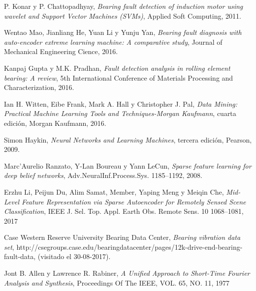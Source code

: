 \documentclass[12pt]{article}%
\begin{document}
\begin{thebibliography}{9}
P. Konar y P. Chattopadhyay, \textit{Bearing fault detection of induction motor using wavelet and Support Vector Machines (SVMs)}, Applied Soft Computing, 2011.

Wentao Mao, Jianliang He, Yuan Li y Yunju Yan, \textit{Bearing fault diagnosis with auto-encoder extreme learning machine: A comparative study}, Journal of Mechanical Engineering Cience, 2016.

Kanpaj Gupta y M.K. Pradhan, \textit{Fault detection analysis in rolling element bearing: A review}, 5th International Conference of Materials Processing and Characterization, 2016.

Ian H. Witten, Eibe Frank, Mark A. Hall y Christopher J. Pal, \textit{Data Mining: Practical Machine Learning Tools and Techniques-Morgan Kaufmann}, cuarta edición, Morgan Kaufmann, 2016.

Simon Haykin, \textit{Neural Networks and Learning Machines}, tercera edición, Pearson, 2009.

Marc’Aurelio Ranzato, Y-Lan Boureau y Yann LeCun, \textit{Sparse feature learning for deep belief networks}, Adv.NeuralInf.Process.Sys. 1185–1192, 2008.

Erzhu Li, Peijun Du, Alim Samat, Member, Yaping Meng y Meiqin Che, \textit{Mid-Level Feature Representation via Sparse Autoencoder for Remotely Sensed Scene Classification}, IEEE J. Sel. Top. Appl. Earth Obs. Remote Sens. 10 1068–1081, 2017

Case Western Reserve University Bearing Data Center, \textit{Bearing vibration data set}, http://csegroups.case.edu/bearingdatacenter/pages/12k-drive-end-bearing-fault-data, (visitado el 30-08-2017).

Jont B. Allen y Lawrence R. Rabiner, \textit{A Unified Approach to Short-Time Fourier Analysis
and Synthesis}, Proceedings Of The IEEE, VOL. 65, NO. 11, 1977


\end{thebibliography}
\end{document}
